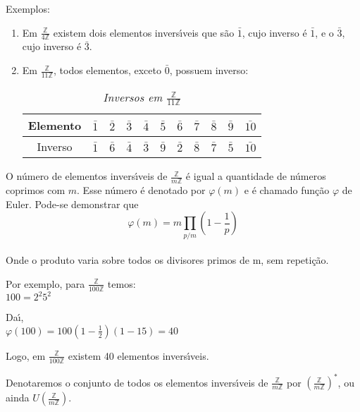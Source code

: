 Exemplos:
\begin{enumerate}
\item Em $\displaystyle\frac{\mathbb{Z}}{4\mathbb{Z}}$ existem dois elementos invers{\'\i}veis que s{\~a}o $\bar{1}$, cujo inverso {\'e} $\bar{1}$, e o $\bar{3}$, cujo inverso {\'e} $\bar{3}$.
\item Em $\displaystyle\frac{\mathbb{Z}}{11\mathbb{Z}} $, todos elementos, exceto $\bar{0}$, possuem inverso:

\begin{table}[h]
   \centering 
   \setlength{\arrayrulewidth}{0,5\arrayrulewidth}
   \caption{\it Inversos em $\displaystyle\frac{\mathbb{Z}}{11\mathbb{Z}}$}
   \begin{tabular}{|c|c|c|c|c|c|c|c|c|c|c|} 
      \hline
      Elemento & $\bar{1}$ & $\bar{2}$ & $\bar{3}$ & $\bar{4}$ & $\bar{5}$ & $\bar{6}$ & $\bar{7}$ & $\bar{8}$ & $\bar{9}$ & $\bar{10}$ \\
      \hline
      Inverso & $\bar{1}$ & $\bar{6}$ & $\bar{4}$ & $\bar{3}$ & $\bar{9}$ & $\bar{2}$ & $\bar{8}$ & $\bar{7}$ & $\bar{5}$ & $\bar{10}$ \\
      \hline
   \end{tabular}
\end{table}
\end{enumerate}

O n{\'u}mero de elementos invers{\'\i}veis de $\displaystyle\frac{\mathbb{Z}}{m\mathbb{Z}}$ {\'e} igual a quantidade de n{\'u}meros coprimos com $m$. Esse n{\'u}mero {\'e} denotado por $\varphi(m)$ e {\'e} chamado fun{\c c}{\~a}o $\varphi$ de Euler. Pode-se demonstrar que
\[\varphi(m)=m\displaystyle\prod_{p/m}\left(1-\displaystyle\frac{1}{p}\right)\]\\
Onde o produto varia sobre todos os divisores primos de m, sem repeti{\c c}{\~a}o.

Por exemplo, para $\displaystyle\frac{\mathbb{Z}}{100\mathbb{Z}}$ temos:\\
$100=2^{2}5^{2}$

Da{\'\i},\\
$\varphi(100)=100\left(1-\displaystyle\frac{1}{2}\right)(1-\displaystyle{1}{5})=40$

Logo, em $\displaystyle\frac{\mathbb{Z}}{100\mathbb{Z}}$ existem 40 elementos invers{\'\i}veis.

\begin{nota} Denotaremos o conjunto de todos os elementos invers{\'\i}veis de $\displaystyle\frac{\mathbb{Z}}{m\mathbb{Z}}$ por $\left(\displaystyle\frac{\mathbb{Z}}{m\mathbb{Z}}\right)^{*}$, ou ainda $U\left(\displaystyle\frac{\mathbb{Z}}{m\mathbb{Z}}\right)$.\end{nota}


